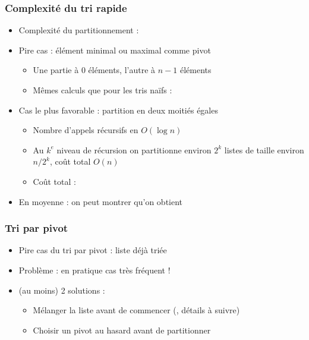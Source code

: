 \documentclass[12pt]{linfo-beamer}
\begin{document}
\begin{frame}
  \frametitle{Complexité du tri rapide}

  \begin{itemize}
  \item Complexité du partitionnement : 

    \medskip

  \item Pire cas : élément minimal ou maximal comme pivot
    \begin{itemize}
    \item Une partie à 0 éléments, l'autre à $n-1$ éléments
    \item Mêmes calculs que pour les tris naïfs : 
    \end{itemize}

    \medskip

  \item Cas le plus favorable : partition en deux moitiés égales
    \begin{itemize}
    \item Nombre d'appels récursifs en $O(\log n)$
    \item Au $k^e$ niveau de récursion on partitionne environ $2^k$
      listes de taille environ $n / 2^k$, coût total $O(n)$
    \item Coût total : 
    \end{itemize}

    \medskip

  \item En moyenne : on peut montrer qu'on obtient
  \end{itemize}
\end{frame}


\begin{frame}
  \frametitle{Tri par pivot}

  \begin{itemize}
  \item Pire cas du tri par pivot : liste déjà triée

    \medskip

  \item Problème : en pratique cas très fréquent !

    \medskip

  \item (au moins) 2 solutions :
    \begin{itemize}
    \item Mélanger la liste avant de commencer (,
      détails à suivre)
    \item Choisir un pivot au hasard avant de partitionner
    \end{itemize}
  \end{itemize}

\end{frame}
\end{document}
